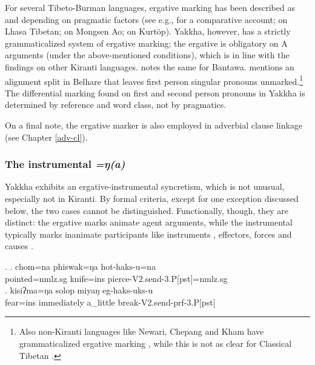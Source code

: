 	
For several Tibeto-Burman languages, ergative marking has been described as  and depending on pragmatic factors  (see e.g., \citet{LaPolla1995_Ergative} for a comparative account; \citet{Tournadre1991_Rhetorical} on Lhasa Tibetan; \citet{Coupe2007_Mongsen} on Mongsen Ao; \citet{Hyslop2011_Kurtop} on Kurtöp). Yakkha, however, has a strictly grammaticalized system of ergative marking; the ergative is obligatory on A arguments (under the above-mentioned conditions), which is in line with the findings on other Kiranti languages. \citet[74]{Doornenbal2009A-grammar} notes  the same for Bantawa.  \citet[549]{Bickel2003Belhare} mentions an alignment split in Belhare that leaves first person singular pronouns unmarked.\footnote{Also non-Kiranti languages like Newari, Chepang and Kham have  grammaticalized ergative marking \citep{LaPolla1995_Ergative}, while this is not as clear for Classical Tibetan \citep{DeLancey2011_Optional}.} The differential marking found on first and second person pronouns in Yakkha is determined by reference and word class, not by pragmatics. 

On a final note, the ergative marker is also employed in adverbial clause linkage (see Chapter \ref{adv-cl}).


\subsubsection{The instrumental \emph{=ŋ(a)}}\label{case-ins}
Yakkha exhibits an ergative-instrumental syncretism, which is not unusual, especially not in Kiranti. By formal criteria, except for one exception discussed below, the two cases cannot be distinguished.  Functionally, though, they are distinct: the ergative marks animate agent arguments, while the instrumental  typically marks inanimate participants like  instruments \Next[a], effectors, forces and causes \Next[b]. 

	\ex. \ag. chom=na phiswak=ŋa hot-haks-u=na\\
	pointed{\sc =nmlz.sg} knife{\sc =ins} pierce-{\sc V2.send-3.P[pst]=nmlz.sg}\\
	\bg. kisiʔma=ŋa solop miyaŋ eg-haks-uks-u\\
		fear{\sc =ins} immediately a\_little  break{\sc-V2.send-prf-3.P[pst] }\\
		 
		
